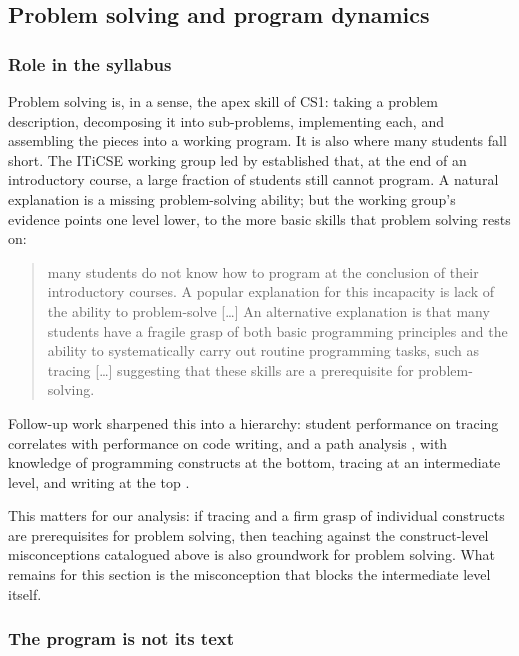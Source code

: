 \mode*
\subsection{Problem solving and program dynamics}
\label{problem-solving}

\subsubsection{Role in the syllabus}

Problem solving is, in a sense, the apex skill of CS1: taking a problem
description, decomposing it into sub-problems, implementing each, and assembling
the pieces into a working program. It is also where many students fall short.
The ITiCSE working group led by \textcite{Lister2004Tracing} established that, at
the end of an introductory course, a large fraction of students still cannot
program. A natural explanation is a missing problem-solving ability; but the
working group's evidence points one level lower, to the more basic skills that
problem solving rests on:
\blockcquote{Lister2004Tracing}{many students do not know how to program at the
conclusion of their introductory courses. A popular explanation for this
incapacity is lack of the ability to problem-solve [\ldots] An alternative
explanation is that many students have a fragile grasp of both basic programming
principles and the ability to systematically carry out routine programming
tasks, such as tracing [\ldots] suggesting that these skills are a prerequisite
for problem-solving.}
Follow-up work sharpened this into a hierarchy: student performance on tracing
correlates with performance on code writing, and a path analysis
, with knowledge of programming constructs at the
bottom, tracing at an intermediate level, and writing at the top
\autocite{Lopez2008Hierarchy}.

This matters for our analysis: if tracing and a firm grasp of individual
constructs are prerequisites for problem solving, then teaching against the
construct-level misconceptions catalogued above is also groundwork for problem
solving. What remains for this section is the misconception that blocks the
intermediate level itself.

\subsubsection{The program is not its text}

